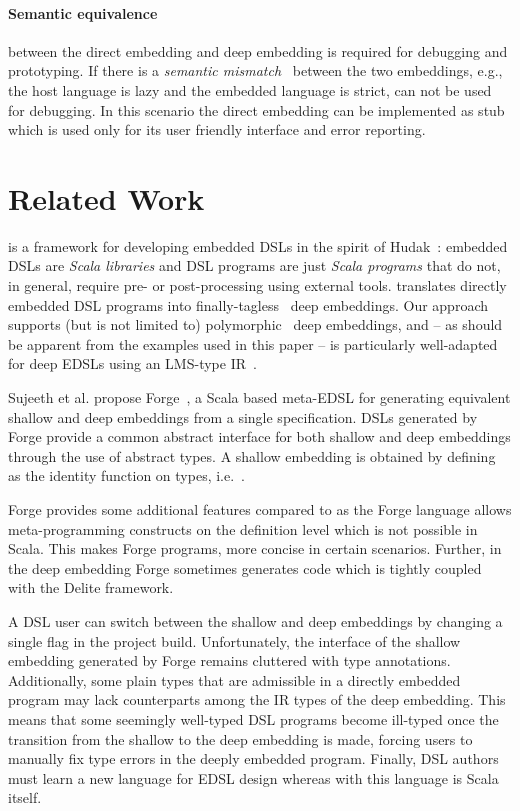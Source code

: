 \paragraph{Semantic equivalence} between the direct embedding and deep embedding
is required for debugging and prototyping. If there is a \emph{semantic mismatch}~\cite{czarnecki_dsl_2004}
 between the two embeddings, e.g., the host language is lazy and the embedded
 language is strict, \yy can not be used for debugging. In this scenario the
 direct embedding can be implemented as stub which is used only for its user
 friendly interface and error reporting.


\section{Related Work}
\label{sec:related-work}

\yy is a framework for developing embedded DSLs in the spirit of
Hudak~\cite{Hudak96csur,Hudak98sr}: embedded DSLs are \emph{Scala
  libraries} and DSL programs are just \emph{Scala programs} that do
not, in general, require pre- or post-processing using external tools.
\yy translates directly embedded DSL programs into
finally-tagless~\cite{carette_finally_2009} deep embeddings.  Our
approach supports (but is not limited to)
polymorphic~\cite{hofer_polymorphic_2008} deep embeddings, and -- as
should be apparent from the examples used in this paper -- is
particularly well-adapted for deep EDSLs using an LMS-type
IR~\cite{rompf_scala-virtualized:_2009,rompf_optimizing_2013}.

Sujeeth et al. propose Forge~\cite{forge}, a Scala based meta-EDSL for generating equivalent
shallow and deep embeddings from a single specification.  DSLs
generated by Forge provide a common abstract interface for both
shallow and deep embeddings through the use of abstract 
types.  A shallow embedding is obtained by defining  as the
identity function on types, i.e.\ .

Forge provides some additional features compared to \yy as the Forge language allows meta-programming
 constructs on the definition level which is not possible in Scala. This makes Forge programs, more
 concise in certain scenarios. Further, in the deep embedding
 Forge sometimes generates code which is tightly coupled with the Delite framework.

A DSL user can switch between the shallow and deep embeddings by
changing a single flag in the project build. Unfortunately, the interface of the shallow
embedding generated by Forge remains cluttered with  type
annotations. Additionally, some plain types that are admissible in a
directly embedded program may lack counterparts among the IR types of
the deep embedding.  This means that some seemingly well-typed DSL
programs become ill-typed once the transition from the shallow to the
deep embedding is made, forcing users to manually fix type errors in
the deeply embedded program. Finally, DSL authors must learn a new
language for EDSL design whereas with \yy this language is Scala
itself.

